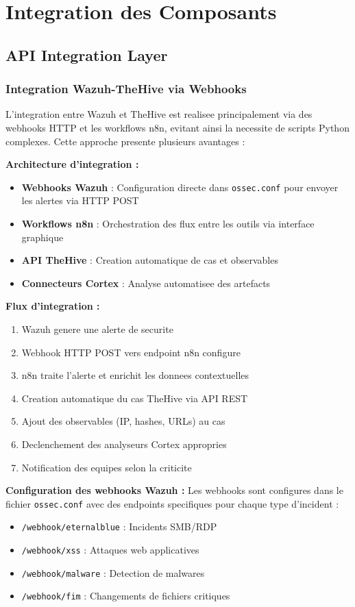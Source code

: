 \section{Integration des Composants}

\subsection{API Integration Layer}

\subsubsection{Integration Wazuh-TheHive via Webhooks}

L'integration entre Wazuh et TheHive est realisee principalement via des webhooks HTTP et les workflows n8n, evitant ainsi la necessite de scripts Python complexes. Cette approche presente plusieurs avantages :

\textbf{Architecture d'integration :}
\begin{itemize}
    \item \textbf{Webhooks Wazuh} : Configuration directe dans \texttt{ossec.conf} pour envoyer les alertes via HTTP POST
    \item \textbf{Workflows n8n} : Orchestration des flux entre les outils via interface graphique
    \item \textbf{API TheHive} : Creation automatique de cas et observables
    \item \textbf{Connecteurs Cortex} : Analyse automatisee des artefacts
\end{itemize}

\textbf{Flux d'integration :}
\begin{enumerate}
    \item Wazuh genere une alerte de securite
    \item Webhook HTTP POST vers endpoint n8n configure
    \item n8n traite l'alerte et enrichit les donnees contextuelles
    \item Creation automatique du cas TheHive via API REST
    \item Ajout des observables (IP, hashes, URLs) au cas
    \item Declenchement des analyseurs Cortex appropries
    \item Notification des equipes selon la criticite
\end{enumerate}

\textbf{Configuration des webhooks Wazuh :}
Les webhooks sont configures dans le fichier \texttt{ossec.conf} avec des endpoints specifiques pour chaque type d'incident :
\begin{itemize}
    \item \texttt{/webhook/eternalblue} : Incidents SMB/RDP
    \item \texttt{/webhook/xss} : Attaques web applicatives
    \item \texttt{/webhook/malware} : Detection de malwares
    \item \texttt{/webhook/fim} : Changements de fichiers critiques
\end{itemize}

